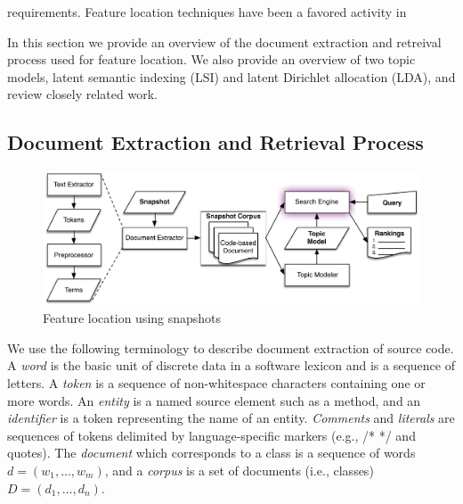 requirements. Feature location techniques have been a favored activity in

In this section we provide an overview of the document extraction and retreival process
used for feature location.
We also provide an overview of two topic models,
latent semantic indexing (LSI) and latent Dirichlet allocation (LDA),
and review closely related work.

\subsection{Document Extraction and Retrieval Process}


\begin{figure}
\vspace{2mm}
\centerline{\includegraphics[width=.75\textwidth]{figures/snapshot-flt}}
\caption{Feature location using snapshots}
\label{fig:snapshot}
\vspace{-2mm}
\end{figure}

We use the following terminology to describe document extraction of source code.
A \textit{word} is the basic unit of discrete data in a software lexicon and is a sequence of letters.
A \textit{token} is a sequence of non-whitespace characters containing one or more words.
An \textit{entity} is a named source element such as a method,
and an \textit{identifier} is a token representing the name of an entity.
\textit{Comments} and \textit{literals} are sequences of tokens delimited by language-specific markers (e.g., /* */ and quotes).
The \textit{document} which corresponds to a class is a sequence of words $d = (w_1, \ldots, w_m)$,
and a \textit{corpus} is a set of documents (i.e., classes) $D = (d_1, \ldots, d_n)$.

